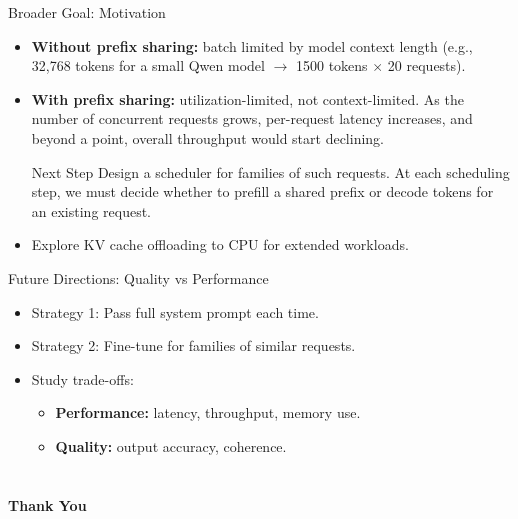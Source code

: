 \documentclass[Serif, 10pt, brown]{beamer}
\theoremstyle{example}
\theoremstyle{plain}
\begin{document}
\begin{frame}{Broader Goal: Motivation}
\begin{itemize}
    \item \textbf{Without prefix sharing:} batch limited by model context length (e.g., 32,768 tokens for a small Qwen model $\rightarrow$ 1500 tokens $\times$ 20 requests).
    \item \textbf{With prefix sharing:} utilization-limited, not context-limited. As the number of concurrent requests grows, per-request latency increases, and beyond a point, overall throughput would start declining.
    \begin{block}{Next Step}
    Design a scheduler for families of such requests. At each scheduling step, we must decide whether to prefill a shared prefix or decode tokens for an existing request.
    \end{block}
    \item Explore KV cache offloading to CPU for extended workloads.
\end{itemize}
\end{frame}

\begin{frame}{Future Directions: Quality vs Performance}
\begin{itemize}
    \item Strategy 1: Pass full system prompt each time.
    \item Strategy 2: Fine-tune for families of similar requests.
    \item Study trade-offs:
    \begin{itemize}
        \item \textbf{Performance:} latency, throughput, memory use.
        \item \textbf{Quality:} output accuracy, coherence.
    \end{itemize}
\end{itemize}
\end{frame}

\section{}
\begin{frame}
    \Huge{\centerline{\bf Thank You}}
\end{frame}
\end{document}
